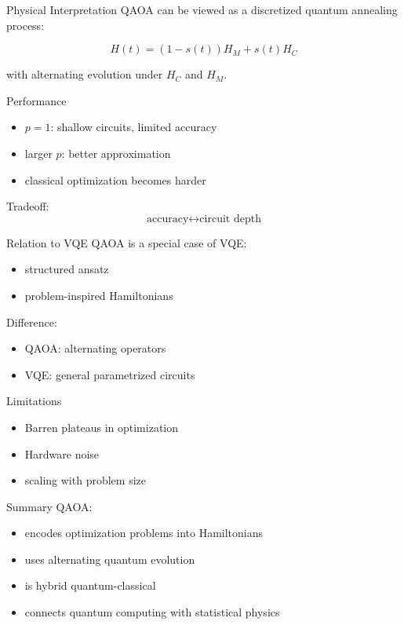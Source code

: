 \documentclass{beamer}
\begin{document}
\begin{frame}{Physical Interpretation}
QAOA can be viewed as a discretized quantum annealing process:

\[
H(t) = (1-s(t))H_M + s(t)H_C
\]

with alternating evolution under \(H_C\) and \(H_M\).
\end{frame}

\begin{frame}{Performance}
\begin{itemize}
\item \(p=1\): shallow circuits, limited accuracy
\item larger \(p\): better approximation
\item classical optimization becomes harder
\end{itemize}

Tradeoff:
\[
\text{accuracy} \leftrightarrow \text{circuit depth}
\]
\end{frame}

\begin{frame}{Relation to VQE}
QAOA is a special case of VQE:
\begin{itemize}
\item structured ansatz
\item problem-inspired Hamiltonians
\end{itemize}

Difference:
\begin{itemize}
\item QAOA: alternating operators
\item VQE: general parametrized circuits
\end{itemize}
\end{frame}

\begin{frame}{Limitations}
\begin{itemize}
\item Barren plateaus in optimization
\item Hardware noise
\item scaling with problem size
\end{itemize}
\end{frame}

\begin{frame}{Summary}
QAOA:
\begin{itemize}
\item encodes optimization problems into Hamiltonians
\item uses alternating quantum evolution
\item is hybrid quantum-classical
\item connects quantum computing with statistical physics
\end{itemize}
\end{frame}
\end{document}
